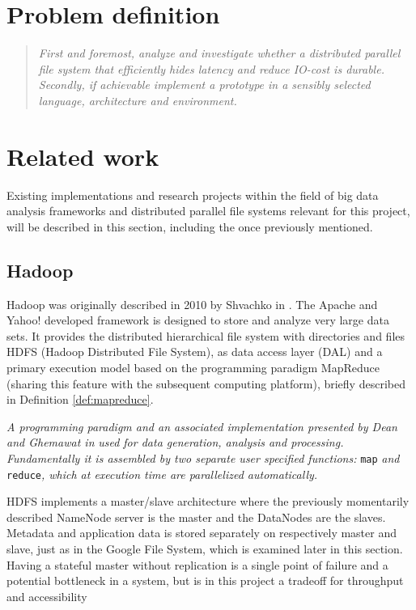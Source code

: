 \section{Problem definition} \label{sec:problem}
\begin{quotation}
\hspace*{-7mm}
\textit{First and foremost, analyze and investigate whether a distributed parallel file system that efficiently hides latency and reduce IO-cost is durable. Secondly, if achievable implement a prototype in a sensibly selected language, architecture and environment.} \newline
\end{quotation}

\section{Related work} \label{sec:related}
Existing implementations and research projects within the field of big data analysis frameworks and distributed parallel file systems relevant for this project, will be described in this section, including the once previously mentioned.

\subsection*{Hadoop}
Hadoop was originally described in 2010 by Shvachko \etal in \cite{Shvachko:2010:HDF:1913798.1914427}. The Apache and Yahoo! developed framework is designed to store and analyze very large data sets. It provides the distributed hierarchical file system with directories and files HDFS (Hadoop Distributed File System), as data access layer (DAL) and a primary execution model based on the programming paradigm MapReduce (sharing this feature with the subsequent computing platform), briefly described in Definition \ref{def:mapreduce}.
\vspace*{5mm}

\begin{definition}[MapReduce] \label{def:mapreduce}
\textit{A programming paradigm and an associated implementation presented by Dean and Ghemawat in} \cite{Dean:2008:MSD:1327452.1327492} \textit{used for data generation, analysis and processing. Fundamentally it is assembled by two separate user specified functions:} \texttt{map} \textit{and} \texttt{reduce}\textit{, which at execution time are parallelized automatically.}
\end{definition}

HDFS implements a master/slave architecture where the previously momentarily described NameNode server is the master and the DataNodes are the slaves. Metadata and application data is stored separately on respectively master and slave, just as in the Google File System, which is examined later in this section. Having a stateful master without replication is a single point of failure and a potential bottleneck in a system, but is in this project a tradeoff for throughput and accessibility

